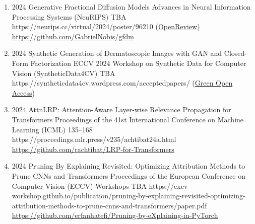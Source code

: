 {\begin{enumerate}
        \item {}
                        {2024}
                        {Generative Fractional Diffusion Models}
                        {Advances in Neural Information Processing Systems (NeuRIPS)}
                        {TBA}
                        {https://neurips.cc/virtual/2024/poster/96210}
                        {(\href{https://openreview.net/forum?id=B9qg3wo75g}{OpenReview})\\
                        \href{https://github.com/GabrielNobis/gfdm}{https://github.com/GabrielNobis/gfdm}
                        }

        \item {}
                        {2024}
                        {Synthetic Generation of Dermatoscopic Images with GAN and Closed-Form Factorization}
                        {ECCV 2024 Workshop on Synthetic Data for Computer Vision (SyntheticData4CV)}
                        {TBA}
                        {https://syntheticdata4cv.wordpress.com/acceptedpapers/}
                        {(\href{https://arxiv.org/abs/2410.05114}{Green Open Access})}


        \item {}
                        {2024}
                        {AttnLRP: Attention-Aware Layer-wise Relevance Propagation for Transformers}
                        {Proceedings of the 41st International Conference on Machine Learning (ICML)}
                        {135--168}
                        {https://proceedings.mlr.press/v235/achtibat24a.html}
                        {
                            \\\href{https://github.com/rachtibat/LRP-for-Transformers}{https://github.com/rachtibat/LRP-for-Transformers}
                        }

        \item {}
                            {2024}
                            {Pruning By Explaining Revisited: Optimizing Attribution Methods to Prune CNNs and Transformers}
                            {Proceedings of the European Conference on Computer Vision (ECCV) Workshops}
                            {TBA}
                            {https://excv-workshop.github.io/publication/pruning-by-explaining-revisited-optimizing-attribution-methods-to-prune-cnns-and-transformers/paper.pdf}
                            {\\\href{https://github.com/erfanhatefi/Pruning-by-eXplaining-in-PyTorch}{https://github.com/erfanhatefi/Pruning-by-eXplaining-in-PyTorch}}


\end{enumerate}}
